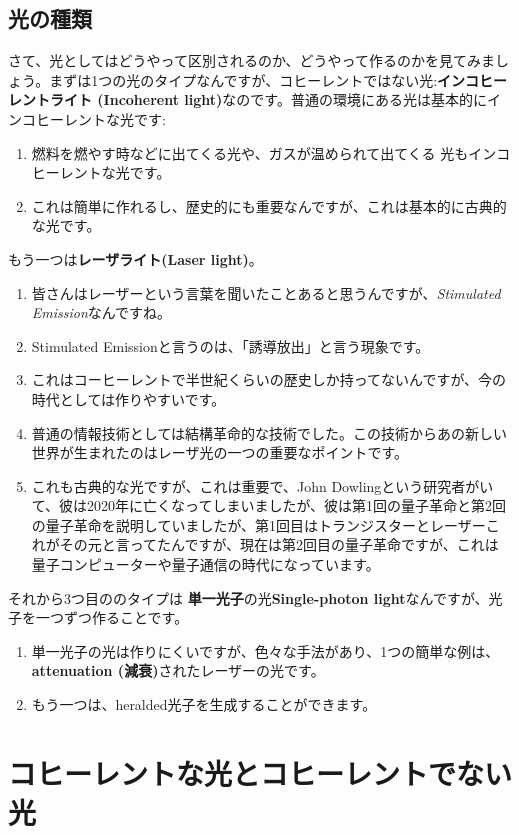 \subsection{光の種類}
さて、光としてはどうやって区別されるのか、どうやって作るのかを見てみましょう。まずは1つの光のタイプなんですが、コヒーレントではない光:\textbf{インコヒーレントライト (Incoherent light)}なのです。普通の環境にある光は基本的にインコヒーレントな光です:
\begin{enumerate}
    \item 燃料を燃やす時などに出てくる光や、ガスが温められて出てくる
光もインコヒーレントな光です。
    \item これは簡単に作れるし、歴史的にも重要なんですが、これは基本的に古典的な光です。
\end{enumerate}
もう一つは\textbf{レーザライト(Laser light)}。
\begin{enumerate}
    \item 皆さんはレーザーという言葉を聞いたことあると思うんですが、\textit{Stimulated Emission}なんですね。
    \item Stimulated Emissionと言うのは、「誘導放出」と言う現象です。
    \item これはコーヒーレントで半世紀くらいの歴史しか持ってないんですが、今の時代としては作りやすいです。
    \item 普通の情報技術としては結構革命的な技術でした。この技術からあの新しい世界が生まれたのはレーザ光の一つの重要なポイントです。
    \item これも古典的な光ですが、これは重要で、John Dowlingという研究者がいて、彼は2020年に亡くなってしまいましたが、彼は第1回の量子革命と第2回の量子革命を説明していましたが、第1回目はトランジスターとレーザーこれがその元と言ってたんですが、現在は第2回目の量子革命ですが、これは量子コンピューターや量子通信の時代になっています。
\end{enumerate}
それから3つ目ののタイプは
\textbf{単一光子}の光\textbf{Single-photon light}なんですが、光子を一つずつ作ることです。
\begin{enumerate}
    \item 単一光子の光は作りにくいですが、色々な手法があり、1つの簡単な例は、\textbf{attenuation (減衰)}されたレーザーの光です。
    \item もう一つは、heralded光子を生成することができます。
\end{enumerate}

\section{コヒーレントな光とコヒーレントでない光}


